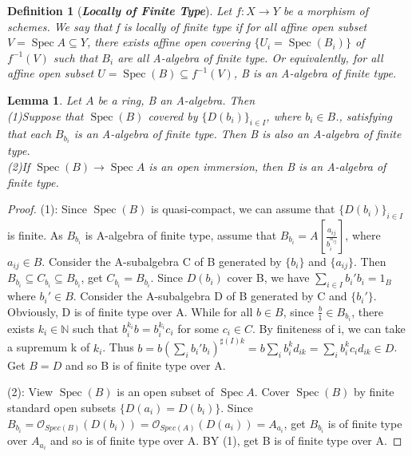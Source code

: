\documentclass{ctexart}
\newtheorem{definition}{Definition}[section]
\newtheorem{lemma}{Lemma}[section]
\newcommand{\spec}{\operatorname{Spec}}
\begin{document}
\begin{definition}[\textbf{\emph{Locally of Finite Type}}]
    Let $f: X \longrightarrow Y$ be a morphism of schemes.
    We say that f is locally of finite type if for all affine open subset $V = \spec A \subseteq Y$, 
    there exists affine open covering $\{U_{i} = \spec(B_{i})\}$ of $f^{-1}(V)$ such that $B_{i}$ are all A-algebra of finite type.
    Or equivalently, for all affine open subset $U = \spec(B) \subseteq f^{-1}(V)$, B is an A-algebra of finite type.
\end{definition}
\begin{lemma}
    Let $A$ be a ring, B an A-algebra.
    Then \\
    (1)Suppose that $\spec(B)$ covered by $\{D(b_{i})\}_{i\in I}$, where $b_{i}\in B$.,
    satisfying that each $B_{b_{i}}$ is an A-algebra of finite type.
    Then B is also an A-algebra of finite type. \\
    (2)If $\spec(B) \longrightarrow \spec A$ is an open immersion, then B is an A-algebra of finite type.
    \label{Lemma 2.10}
\end{lemma}
\begin{proof}
    (1): Since $\spec(B)$ is quasi-compact, we can assume that $\{D(b_{i})\}_{i\in I}$ is finite.
    As $B_{b_{i}}$ is A-algebra of finite type, assume that $B_{b_{i}} = A[\frac{a_{ij}}{b_{i}^{n_{ij}}}]$, where $a_{ij}\in B$.
    Consider the A-subalgebra C of B generated by $\{b_{i}\}$ and $\{a_{ij}\}$.
    Then $B_{b_{i}} \subseteq C_{b_{i}} \subseteq B_{b_{i}}$, get $C_{b_{i}} = B_{b_{i}}$.
    Since $D(b_{i})$ cover B, we have $\sum_{i\in I} b_{i}'b_{i} = 1_{B}$ where $b_{i}'\in B$.
    Consider the A-subalgebra D of B generated by C and $\{b_{i}'\}$.
    Obviously, D is of finite type over A.
    While for all $b\in B$, since $\frac{b}{1}\in B_{b_{i}}$, there exists $k_{i}\in \mathbb{N}$ such that $b_{i}^{k_{i}}b = b_{i}^{k_{i}}c_{i}$ for some $c_{i}\in C$.
    By finiteness of i, we can take a supremum k of $k_{i}$.
    Thus $b = b(\sum_{i} b_{i}'b_{i})^{\sharp(I)k} = b\sum_{i} b_{i}^{k}d_{ik} = \sum_{i} b_{i}^{k}c_{i}d_{ik}\in D$.
    Get $B = D$ and so B is of finite type over A.
    \par
    (2): View $\spec(B)$ is an open subset of $\spec A$.
    Cover $\spec(B)$ by finite standard open subsets $\{D(a_{i}) = D(b_{i})\}$.
    Since $B_{b_{i}} = \mathcal{O}_{Spec(B)}(D(b_{i})) = \mathcal{O}_{Spec(A)}(D(a_{i})) = A_{a_{i}}$, 
    get $B_{b_{i}}$ is of finite type over $A_{a_{i}}$ and so is of finite type over A.
    BY (1), get B is of finite type over A.
\end{proof}
\end{document}
